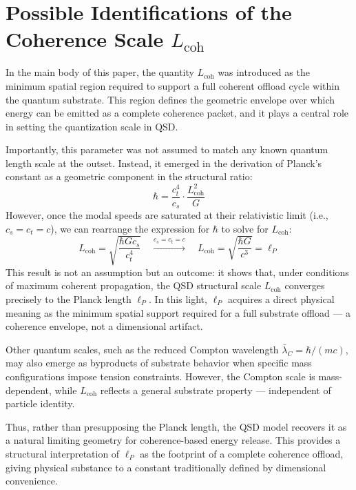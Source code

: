 \documentclass[ht-mathphys]{ht-fmt}
\theoremstyle{thmstyleone}%
\theoremstyle{thmstyletwo}%
\theoremstyle{thmstylethree}%
\begin{document}
\pagebreak
\appendix


\section{Possible Identifications of the Coherence Scale \( L_{\text{coh}} \)}
\label{app:planklength}

In the main body of this paper, the quantity \(L_{\text{coh}}\) was introduced as the minimum spatial region required to support a full coherent offload cycle within the quantum substrate. This region defines the geometric envelope over which energy can be emitted as a complete coherence packet, and it plays a central role in setting the quantization scale in QSD.

Importantly, this parameter was not assumed to match any known quantum length scale at the outset. Instead, it emerged in the derivation of Planck’s constant as a geometric component in the structural ratio:
\[
\hbar = \frac{c_t^4}{c_s} \cdot \frac{L_{\text{coh}}^2}{G}
\]
However, once the modal speeds are saturated at their relativistic limit (i.e., \(c_s = c_t = c\)), we can rearrange the expression for \(\hbar\) to solve for \(L_{\text{coh}}\):
\[
L_{\text{coh}} = \sqrt{\frac{\hbar G c_s}{c_t^4}} \quad \xrightarrow{c_s = c_t = c} \quad L_{\text{coh}} = \sqrt{\frac{\hbar G}{c^3}} = \ell_P
\]
This result is not an assumption but an outcome: it shows that, under conditions of maximum coherent propagation, the QSD structural scale \(L_{\text{coh}}\) converges precisely to the Planck length \(\ell_P\). In this light, \(\ell_P\) acquires a direct physical meaning as the minimum spatial support required for a full substrate offload — a coherence envelope, not a dimensional artifact.

Other quantum scales, such as the reduced Compton wavelength \(\bar{\lambda}_C = \hbar / (mc)\), may also emerge as byproducts of substrate behavior when specific mass configurations impose tension constraints. However, the Compton scale is mass-dependent, while \(L_{\text{coh}}\) reflects a general substrate property — independent of particle identity.

Thus, rather than presupposing the Planck length, the QSD model recovers it as a natural limiting geometry for coherence-based energy release. This provides a structural interpretation of \(\ell_P\) as the footprint of a complete coherence offload, giving physical substance to a constant traditionally defined by dimensional convenience.
\end{document}
